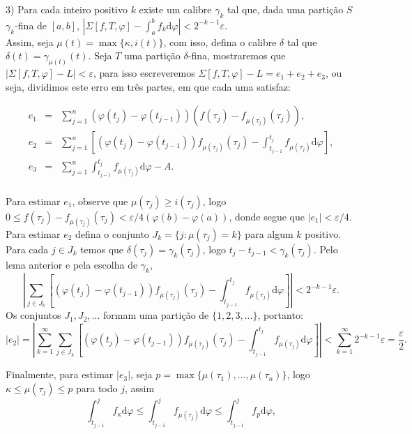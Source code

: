 \documentclass[12pt, a4paper]{article}
\theoremstyle{definition}
\begin{document}
3) Para cada inteiro positivo $k$ existe um calibre $\gamma_k$ tal que, dada uma partição $S$ $\gamma_k$-fina de $[a,b]$,  $|\Sigma[f,T,\varphi]- \int_a^b f_k  \text{d}\varphi |<2^{-k-1}\varepsilon$. \\

Assim, seja $\mu (t)=\max \{ \kappa,i(t) \}$, com isso, defina o calibre $\delta$ tal que $\delta(t)=\gamma_{\mu(t)}(t)$. Seja $T$ uma partição $\delta$-fina, mostraremos que $|\Sigma[f,T,\varphi]-L|<\varepsilon$, para isso escreveremos $\Sigma[f,T,\varphi]-L=e_1+e_2+e_3$, ou seja, dividimos este erro em três partes, em que cada uma satisfaz:  

$$\begin{array}{lll}

e_1 & = & \displaystyle\sum_{j=1}^n (\varphi(t_j)-\varphi(t_{j-1}))(f(\tau_j) - f_{\mu(\tau_j)}(\tau_j)),\\
e_2 & = & \displaystyle\sum_{j=1}^n \left[ (\varphi(t_j)-\varphi(t_{j-1}))f_{\mu(\tau_j)}(\tau_j)-\displaystyle\int_{t_{j-1}}^{t_j}f_{\mu(\tau_j)} \text{d}\varphi \right], \\
e_3 & = &   \displaystyle\sum_{j=1}^n \displaystyle\int_{t_{j-1}}^{t_j}f_{\mu(\tau_j)} \text{d}\varphi - A. \\

\end{array}$$

Para estimar $e_1$, observe que $\mu(\tau_j)\geq i(\tau_j)$, logo $0\leq f(\tau_j)-f_{\mu(\tau_j)}(\tau_j)< \varepsilon / 4(\varphi(b)-\varphi(a))$, donde segue que $|e_1|<\varepsilon/4$. Para estimar $e_2$ defina o conjunto $J_k=\{ j:\mu(\tau_j)=k \}$ para algum $k$ positivo. Para cada $j\in J_k$ temos que $\delta(\tau_j)=\gamma_k (\tau_j)$, logo $t_j-t_{j-1}<\gamma_k (\tau_j)$. Pelo lema anterior e pela escolha de $\gamma_k$, $$\left| \sum_{j\in J_k}\left[ (\varphi(t_j)-\varphi(t_{j-1}))f_{\mu(\tau_j)}(\tau_j)-\int_{t_{j-1}}^{t_j}f_{\mu(\tau_j)} \text{d}\varphi  \right] \right| < 2^{-k-1}\varepsilon.$$ Os conjuntos $J_1,J_2,...$ formam uma partição de $\{1,2,3,...\}$, portanto: $$ |e_2|= \left|\sum_{k=1}^{\infty} \sum_{j\in J_k}\left[ (\varphi(t_j)-\varphi(t_{j-1}))f_{\mu(\tau_j)}(\tau_j)-\int_{t_{j-1}}^{t_j}f_{\mu(\tau_j)} \text{d}\varphi  \right] \right| < \sum_{k=1}^{\infty} 2^{-k-1}\varepsilon=\frac{\varepsilon}{2}.$$  

Finalmente, para estimar $|e_3|$, seja $p=\max\{ \mu(\tau_1),...,\mu(\tau_n) \}$, logo $\kappa\leq \mu(\tau_j)\leq p$ para todo $j$, assim $$\int_{t_{j-1}}^{j}f_\kappa  \text{d}\varphi \leq \int_{t_{j-1}}^{j}f_{\mu(\tau_j)}  \text{d}\varphi \leq \int_{t_{j-1}}^{j}f_p  \text{d}\varphi ,$$
\end{document}
